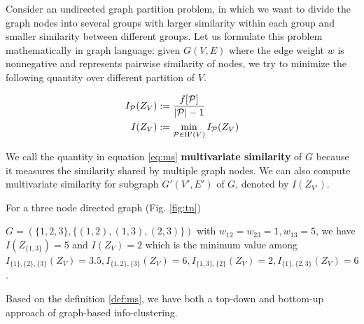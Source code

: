 \documentclass{article}
\begin{document}
Consider an undirected graph partition problem, in which we want to divide the graph nodes into several groups with larger similarity within each group and smaller similarity between different groups. Let us formulate this problem mathematically in graph language: given $G(V, E)$ where the edge weight $w$ is nonnegative and represents pairwise similarity of nodes, we try to minimize the following quantity over different partition of $V$.
\begin{definition}\label{def:ms}
\begin{align}
I_{\mathcal{P}}(Z_V) & := \frac{ f[\mathcal{P}] }{  \lvert\mathcal{P}\rvert - 1 }\\
I(Z_V) & := \min_{\mathcal{P} \in \Pi'(V)} I_{\mathcal{P}}(Z_V)  \label{eq:ms}
\end{align}
\end{definition}
We call the quantity in equation \eqref{eq:ms} \textbf{multivariate similarity} of $G$ because it measures the similarity shared by multiple graph nodes. We can also compute multivariate similarity for subgraph $G'(V',E')$ of $G$, denoted by $I(Z_{V'})$. 
\begin{example}\label{eg:three}
For a three node directed graph (Fig. \ref{fig:tn}) 

$G=(\{1,2,3\},\{(1,2),(1,3),(2,3)\})$ with $w_{12}=w_{23}=1, w_{13}=5$, we have $I(Z_{\{1,3\}}) = 5$ and $I(Z_V) = 2$ which is the minimum value among $I_{\{1\},\{2\},\{3\}}(Z_V)=3.5, I_{\{1, 2\},\{3\}}(Z_V)=6, I_{\{1,3\},\{2\}}(Z_V)=2, I_{\{1\},\{2,3\}}(Z_V)=6$.
\end{example}

Based on the definition \eqref{def:ms}, we have both a top-down and bottom-up approach of graph-based info-clustering.
\end{document}
